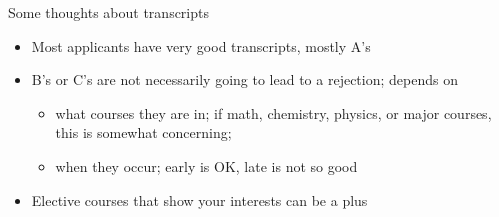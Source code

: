 \begin{frame}[fragile]{Some thoughts about transcripts}

    \begin{itemize}
        \item Most applicants have very good transcripts, mostly A's
        \item B's or C's are not necessarily going to lead to a rejection; depends on 
        \begin{itemize}
            \item \textcolor{blue!30}{what courses} they are in; if math, chemistry, physics, or major courses, this is somewhat concerning; 
            \item \textcolor{green!60!black}{when} they occur; early is OK, late is not so good
        \end{itemize}
        \item Elective courses that show your interests can be a plus
    \end{itemize}
\end{frame}

